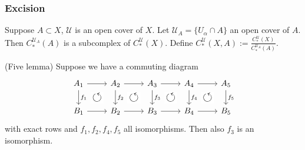 \documentclass[a4paper,11pt]{article}
\begin{document}
			\subsubsection*{Excision}
				Suppose $A\subset X$, $\mathcal{U}$ is an open cover of $X$. Let $\mathcal{U}_A=\{U_\alpha\cap A\}$ an open cover of $A$. Then $C_\ast^{\mathcal{U}_A}(A)$ is a subcomplex of $C_\ast^\mathcal{U}(X)$. Define $C_\ast^\mathcal{U}(X,A):=\frac{C_\ast^\mathcal{U}(X)}{C_\ast^{\mathcal{U}_A}(A)}$.

				\begin{lemma}
					(Five lemma) Suppose we have a commuting diagram
					\begin{equation*}
						\begin{tikzcd}
							A_1\ar[d,"f_1"]\ar[r]& A_2\ar[d,"f_2"]\ar[r]& A_3\ar[d,"f_3"]\ar[r]& A_4\ar[d,"f_4"]\ar[r]& A_5\ar[d,"f_5"]\\
							B_1\arrow[ur, phantom, "\scalebox{1.5}{$\circlearrowleft$}" description]\ar[r]& B_2\arrow[ur, phantom, "\scalebox{1.5}{$\circlearrowleft$}" description]\ar[r]& B_3\arrow[ur, phantom, "\scalebox{1.5}{$\circlearrowleft$}" description]\ar[r]& B_4\arrow[ur, phantom, "\scalebox{1.5}{$\circlearrowleft$}" description]\ar[r]& B_5
						\end{tikzcd}
					\end{equation*}
					with exact rows and $f_1,f_2,f_4,f_5$ all isomorphisms. Then also $f_3$ is an isomorphism.
				\end{lemma}
\end{document}
